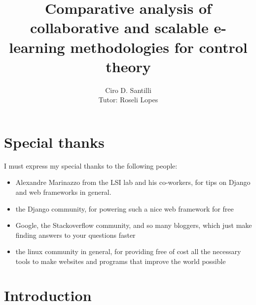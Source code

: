 \documentclass[12pt]{article}
\title{Comparative analysis of collaborative and scalable e-learning methodologies for control theory}
\author{Ciro D. Santilli\\
Tutor: Roseli Lopes
}
\begin{document}
\begin{comment}
TODO simple top use cases
TODO bugtracker alexandre:

* trac
* bugzilla
* redmine

* sakai

* launchpad

descricao do sistema

use cases
requisitos funcionais/nao funcionais

keyword: project management

difficulty: multiple login

\newpage
\end{comment}

\maketitle
\newpage


\tableofcontents
\newpage

\section{Special thanks} \label{special-thanks}

I must express my special thanks to the following people:

\begin{itemize}
  \item Alexandre Marinazzo from the LSI lab and his co-workers, for tips on Django and web frameworks in general.
  \item the Django community, for powering such a nice web framework for free
  \item Google, the Stackoverflow community, and so many bloggers, which just make finding answers to your questions faster
  \item the linux community in general, for providing free of cost all the necessary tools
      to make websites and programs that improve the world possible
\end{itemize}
\newpage

\section{Introduction} \label{introduction}
\end{document}
